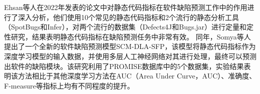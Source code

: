 


Ehsan等人在2022年发表的论文\cite{ehsan2022}中对静态代码指标在软件缺陷预测工作中的作用进行了深入分析，他们使用10个常见的静态代码指标和2个流行的静态分析工具（SpotBugs和Infer），对两个流行的数据集（Defects4J和Bugs.jar）进行定量和定性研究，结果表明静态代码指标在缺陷预测任务中非常有效。
同年，Somya等人\cite{somya2022}提出了一个全新的软件缺陷预测模型SCM-DLA-SFP，该模型将静态代码指标作为深度学习模型的输入数据，并使用多层人工神经网络对其进行处理，最终可以预测出软件的缺陷模块。该研究利用了PROMISE数据库中的5个数据集，实验结果表明该方法相比于其他深度学习方法在AUC（Area Under Curve，AUC）、准确度、F-measure等指标上均有不同程度的提升。

